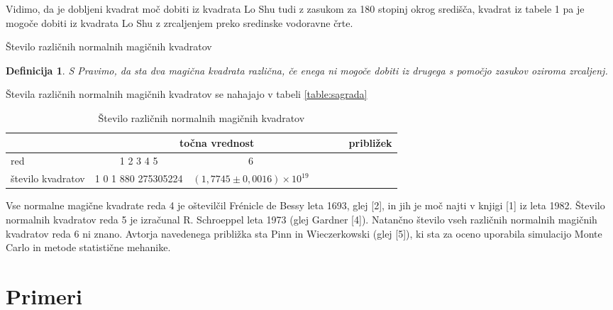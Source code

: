 \documentclass[a4paper,12pt]{article}
\newtheorem{definition}{Definicija}
\newcommand{\pojem}[1]{\emph{#1}}
\begin{document}
Vidimo, da je dobljeni kvadrat moč dobiti iz kvadrata Lo Shu tudi z zasukom za
180 stopinj okrog središča, kvadrat iz tabele 1 pa je mogoče dobiti
iz kvadrata Lo Shu z zrcaljenjem preko sredinske vodoravne črte.

Število različnih normalnih magičnih kvadratov

\begin{definition}
   
S
      Pravimo, da sta dva magična kvadrata \pojem{različna}, če enega ni mogoče dobiti
      iz drugega s pomočjo zasukov oziroma zrcaljenj.
   \end{definition}

Števila različnih normalnih magičnih kvadratov se nahajajo v tabeli \ref{table:sagrada}

\begin{table}[!ht]
   \centering
\caption{Število različnih normalnih magičnih kvadratov}
\begin{tabular}{lcccccc}\toprule

   &\multicolumn{5}{c}{točna vrednost}&približek\\
    \midrule 
      red             &1 2 3 4 5&6\\
      število kvadratov&1 0 1 880 275305224&$(1,7745\pm 0,0016)\times 10^{19} $\\
      \bottomrule
\end{tabular}
\end{table}



Vse normalne magične kvadrate reda 4 je oštevilčil Frénicle de Bessy
leta 1693, glej [2], in jih je moč najti v knjigi [1]
iz leta 1982. Število normalnih kvadratov reda 5 je izračunal
R. Schroeppel leta 1973 (glej Gardner [4]).
Natančno število vseh različnih normalnih magičnih kvadratov reda 6 ni znano.
Avtorja navedenega približka sta Pinn in Wieczerkowski (glej [5]), ki
sta za oceno uporabila simulacijo Monte Carlo in metode statistične mehanike.
\cite{bessy, berlekamp, gardner, pinn}


\section{Primeri}
\end{document}
